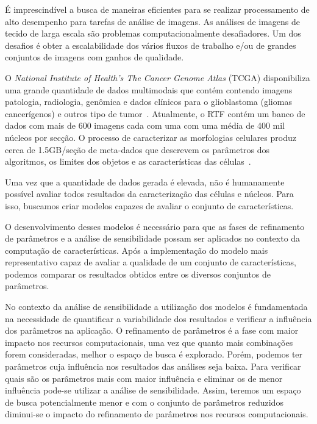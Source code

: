 \documentclass[a4paper,10pt]{article}
\begin{document}
É imprescindível a busca de maneiras eficientes para se realizar processamento de alto desempenho para tarefas de análise de imagens. As análises de imagens de tecido de larga escala são problemas computacionalmente desafiadores. Um dos desafios é obter a escalabilidade dos vários fluxos de trabalho e/ou de grandes conjuntos de imagens com ganhos de qualidade. 

O \textit{National Institute of Health’s The Cancer Genome Atlas} (TCGA) disponibiliza uma grande quantidade de dados multimodais que contém contendo imagens patologia, radiologia, genômica e dados clínicos para o glioblastoma (gliomas cancerígenos) e outros tipo de tumor~\cite{mclendon2008comprehensive}. Atualmente, o RTF contém um banco de dados com mais de 600 imagens cada com uma com uma média de 400 mil núcleos por secção. O processo de caracterizar as morfologias celulares produz cerca de 1.5GB/seção de meta-dados que descrevem os parâmetros dos algoritmos, os limites dos objetos e as características das células~\cite{cooper2011morphological}.

Uma vez que a quantidade de dados gerada é elevada, não é humanamente possível avaliar todos resultados da caracterização das células e núcleos. Para isso, buscamos criar modelos capazes de avaliar o conjunto de características.

O desenvolvimento desses modelos é necessário para que as fases de refinamento de parâmetros e a análise de sensibilidade possam ser aplicados no contexto da computação de características. Após a implementação do modelo mais representativo capaz de avaliar a qualidade de um conjunto de características, podemos comparar os resultados obtidos entre os diversos conjuntos de parâmetros. 

No contexto da análise de sensibilidade a utilização dos modelos é fundamentada na necessidade de quantificar a variabilidade dos resultados e verificar a influência dos parâmetros na aplicação. O refinamento de parâmetros é a fase com maior impacto nos recursos computacionais, uma vez que quanto mais combinações forem consideradas, melhor o espaço de busca é explorado. Porém, podemos ter parâmetros cuja influência nos resultados das análises seja baixa. Para verificar quais são os parâmetros mais com maior influência e eliminar os de menor influência pode-se utilizar a análise de sensibilidade. Assim, teremos um espaço de busca potencialmente menor e com o conjunto de parâmetros reduzidos diminui-se o impacto do refinamento de parâmetros nos recursos computacionais.
\end{document}
